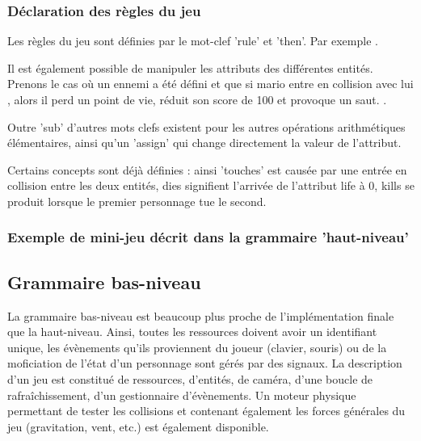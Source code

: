 \subsubsection{Déclaration des règles du jeu}

Les règles du jeu sont définies par le mot-clef 'rule' et 'then'.
Par exemple .

Il est également possible de manipuler les attributs des différentes entités. Prenons le cas où un ennemi a été défini 
et que si mario entre en collision avec lui , alors il perd un point de vie, réduit son score de 100 et provoque un saut.
 .

Outre 'sub' d'autres mots clefs existent pour les autres opérations arithmétiques élémentaires, ainsi qu'un 'assign' qui change directement
la valeur de l'attribut.

Certains concepts sont déjà définies : ainsi 'touches' est causée par une entrée en collision entre les deux entités, dies signifient l'arrivée de l'attribut
life à 0, kills se produit lorsque le premier personnage tue le second.

\subsubsection{Exemple de mini-jeu décrit dans la grammaire 'haut-niveau'}


\subsection{Grammaire bas-niveau}

La grammaire bas-niveau est beaucoup plus proche de l'implémentation finale que la haut-niveau.
Ainsi, toutes les ressources doivent avoir un identifiant unique, les évènements qu'ils proviennent du joueur (clavier, souris) ou de la moficiation
de l'état d'un personnage sont gérés par des signaux.
La description d'un jeu est constitué de ressources, d'entités, de caméra, d'une boucle de rafraîchissement, d'un gestionnaire d'évènements.
Un moteur physique permettant de tester les collisions et contenant également les forces générales du jeu (gravitation, vent, etc.) est également disponible.

